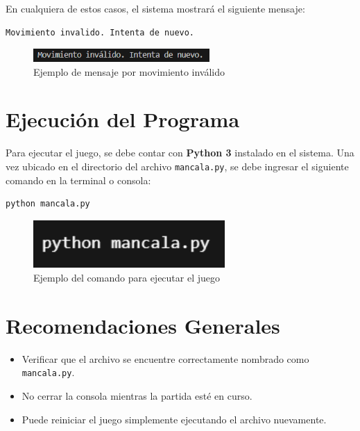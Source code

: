 \documentclass[12pt]{article}
\begin{document}
En cualquiera de estos casos, el sistema mostrará el siguiente mensaje:

\begin{lstlisting}
Movimiento invalido. Intenta de nuevo.
\end{lstlisting}

\begin{figure}[h!]
    \centering
    \includegraphics[width=0.6\textwidth]{Error.png}
    \caption{Ejemplo de mensaje por movimiento inválido}
    \label{fig:error}
\end{figure}

\section*{Ejecución del Programa}

Para ejecutar el juego, se debe contar con \textbf{Python 3} instalado en el sistema. Una vez ubicado en el directorio del archivo \texttt{mancala.py}, se debe ingresar el siguiente comando en la terminal o consola:

\begin{verbatim}
python mancala.py
\end{verbatim}

\begin{figure}[h!]
    \centering
    \includegraphics[width=0.65\textwidth]{Ejecutar.png}
    \caption{Ejemplo del comando para ejecutar el juego}
    \label{fig:ejecutar}
\end{figure}

\section{Recomendaciones Generales}

\begin{itemize}
    \item Verificar que el archivo se encuentre correctamente nombrado como \texttt{mancala.py}.
    \item No cerrar la consola mientras la partida esté en curso.
    \item Puede reiniciar el juego simplemente ejecutando el archivo nuevamente.
\end{itemize}
\end{document}
